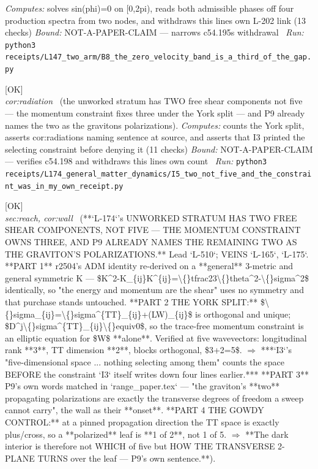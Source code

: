 \begin{description}
\emph{Computes:} solves sin(phi)=0 on [0,2pi), reads both admissible phases off four production spectra from two nodes, and withdraws this lines own L-202 link (13 checks)
 \emph{Bound:} NOT-A-PAPER-CLAIM --- narrows c54.195s withdrawal
\ \emph{Run:} \texttt{python3 receipts/L147\_two\_arm/B8\_the\_zero\_velocity\_band\_is\_a\_third\_of\_the\_gap.py}
\item[\label{rcpt:I5_two_not_five_and_the_constraint_was_in_my_own_receipt}\texttt{I5\_two\_not\_five\_and\_the\_constraint\_was\_in\_my\_own\_receipt}]\hfill\textsf{[OK]}\\
\textit{cor:radiation} \ (the unworked stratum has TWO free shear components not five --- the momentum constraint fixes three under the York split --- and P9 already names the two as the gravitons polarizations). 
\emph{Computes:} counts the York split, asserts cor:radiations naming sentence at source, and asserts that I3 printed the selecting constraint before denying it (11 checks)
 \emph{Bound:} NOT-A-PAPER-CLAIM --- verifies c54.198 and withdraws this lines own count
\ \emph{Run:} \texttt{python3 receipts/L174\_general\_matter\_dynamics/I5\_two\_not\_five\_and\_the\_constraint\_was\_in\_my\_own\_receipt.py}
\item[\label{rcpt:I7_the_free_shear_is_two_not_five_and_the_corpus_already_names_the_two}\texttt{I7\_the\_free\_shear\_is\_two\_not\_five\_and\_the\_corpus\_already\_names\_the\_two}]\hfill\textsf{[OK]}\\
\textit{sec:reach, cor:wall} \ (**`L-174`'s UNWORKED STRATUM HAS TWO FREE SHEAR COMPONENTS, NOT FIVE --- THE MOMENTUM CONSTRAINT OWNS THREE, AND P9 ALREADY NAMES THE REMAINING TWO AS THE GRAVITON'S POLARIZATIONS.** Lead `L-510`; VEINS `L-165`, `L-175`. **PART 1** r2504's ADM identity re-derived on a **general** 3-metric and general symmetric K --- \$K\textasciicircum{}2-K\_\{ij\}K\textasciicircum{}\{ij\}=\textbackslash\{\}tfrac23\textbackslash\{\}theta\textasciicircum{}2-\textbackslash\{\}sigma\textasciicircum{}2\$ identically, so "the energy and momentum are the shear" uses no symmetry and that purchase stands untouched. **PART 2 THE YORK SPLIT:** \$\textbackslash\{\}sigma\_\{ij\}=\textbackslash\{\}sigma\textasciicircum{}\{TT\}\_\{ij\}+(LW)\_\{ij\}\$ is orthogonal and unique; \$D\textasciicircum{}j\textbackslash\{\}sigma\textasciicircum{}\{TT\}\_\{ij\}\textbackslash\{\}equiv0\$, so the trace-free momentum constraint is an elliptic equation for \$W\$ **alone**. Verified at five wavevectors: longitudinal rank **3**, TT dimension **2**, blocks orthogonal, \$3+2=5\$. \ensuremath{\Rightarrow} ***`I3`'s "five-dimensional space ... nothing selecting among them" counts the space BEFORE the constraint `I3` itself writes down four lines earlier.*** **PART 3** P9's own words matched in `range\_paper.tex` --- "the graviton's **two** propagating polarizations are exactly the transverse degrees of freedom a sweep cannot carry", the wall as their **onset**. **PART 4 THE GOWDY CONTROL:** at a pinned propagation direction the TT space is exactly plus/cross, so a **polarized** leaf is **1 of 2**, not 1 of 5. \ensuremath{\Rightarrow} **The dark interior is therefore not WHICH of five but HOW THE TRANSVERSE 2-PLANE TURNS over the leaf --- P9's own sentence.**). 

\end{description}
